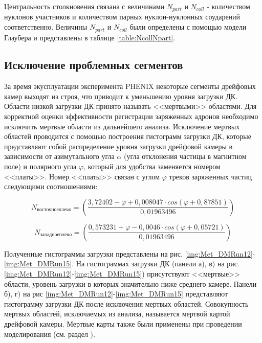 Центральность столкновения связана с величинами $N_{part}$ и $N_{coll}$ - количеством нуклонов участников и количеством парных нуклон-нуклонных соударений соответственно. Величины $N_{part}$ и $N_{coll}$ были определены с помощью модели Глаубера и представлены в таблице \ref{table:NcollNpart}.

\subsection{Исключение проблемных сегментов} \label{sect3_DM}
За время экусплуатации эксперимента PHENIX некоторые сегменты дрейфовых камер выходят из строя, что приводит к уменьшению уровня загрузки ДК. Области низкой загрузки ДК принято называть <<мертвыми>> областями. 
Для корректной оценки эффективности регистрации заряженных адронов необходимо исключить мертвые области из дальнейшего анализа. 
Исключение мертвых областей проводится с помощью построения гистограмм загрузки ДК, которые представляют собой распределение уровня загрузки дрейфовой камеры в зависимости от азимутального угла $\alpha$ (угла отклонения частицы в магнитном поле) и полярного угла $\varphi$, который для удобства заменяется номером <<платы>>. Номер <<платы>> связан с углом $\varphi$ треков заряженных частиц следующими соотношениями: 

\begin{equation}
	N_{восточное плечо} = \left( \frac{3,72402 - \varphi + 0,008047 \cdot cos(\varphi + 0,87851)}{0,01963496} \right)
\end{equation}


\begin{equation}
	N_{западное плечо} = \left( \frac{0,573231 + \varphi - 0,0046 \cdot cos(\varphi + 0,05721)}{0,01963496} \right)
\end{equation}

Полученные гистограммы загрузки представлены на рис. \ref{img:Met_DMRun12}-\ref{img:Met_DMRun15}. 
На гистограммах загрузки ДК (панели а), в) на рис. \ref{img:Met_DMRun12}-\ref{img:Met_DMRun15}) присутствуют <<мертвые>> области, уровень загрузки в которых значительно ниже среднего камере. 
Панели б), г) на рис \ref{img:Met_DMRun12}-\ref{img:Met_DMRun15} представляют гистограмму загрузки ДК после исключения мертвых областей. 
Совокупность мертвых областей, исключаемых из анализа, называется мертвой картой дрейфовой камеры. Мертвые карты также были применены при проведении моделирования (см. раздел \label{sect3:EffRec}).


